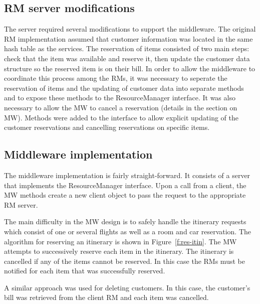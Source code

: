 \documentclass{article}
\begin{document}
	
\subsection{RM server modifications}
The server required several modifications to support the middleware. 
The original RM implementation assumed that customer information was located in the same hash table as the services. 
The reservation of items consisted of two main steps: check that the item was available and reserve it, then update the customer data structure so the reserved item is on their bill. 
In order to allow the middleware to coordinate this process among the RMs, it was necessary to seperate the reservation of items and the updating of customer data into separate methods and to expose these methods to the ResourceManager interface. 
It was also necessary to allow the MW to cancel a reservation (details in the section on MW). 
Methods were added to the interface to allow explicit updating of the customer reservations and cancelling reservations on specific items. 
    	
\subsection{Middleware implementation}

The middleware implementation is fairly straight-forward. 
It consists of a server that implements the ResourceManager interface. Upon a call from a client, the MW methods create a new client object to pass the request to the appropriate RM server.

The main difficulty in the MW design is to safely handle the itinerary requests which consist of one or several flights as well as a room and car reservation. 
The algorithm for reserving an itinerary is shown in Figure~\ref{f:res-itin}. The MW attempts to successively reserve each item in the itinerary. The itinerary is cancelled if any of the items cannot be reserved. In this case the RMs must be notified for each item that was successfully reserved. 

A similar approach was used for deleting customers. In this case, the customer's bill was retrieved from the client RM and each item was cancelled.
\end{document}
